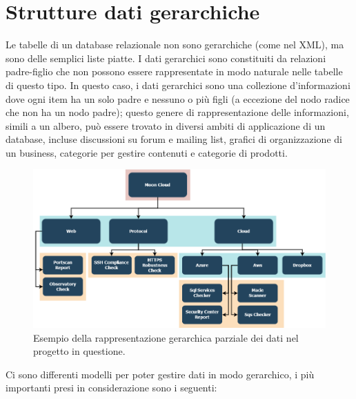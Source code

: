 \section{Strutture dati gerarchiche}
Le tabelle di un database relazionale non sono gerarchiche (come nel XML), ma sono delle semplici liste piatte. I dati gerarchici sono 
constituiti da relazioni padre-figlio che non possono essere rappresentate in modo naturale nelle tabelle di questo tipo.
In questo caso, i dati gerarchici sono una collezione d'informazioni dove ogni item ha un solo padre e nessuno o più figli 
(a eccezione del nodo radice che non ha un nodo padre); questo genere di rappresentazione delle informazioni, simili a un albero, 
può essere trovato in diversi ambiti di applicazione di un database, incluse discussioni su forum e mailing list, grafici di 
organizzazione di un business, categorie per gestire contenuti e categorie di prodotti.
%
\begin{figure}[ht!]
    \centering
    \includegraphics[scale=0.46]{images/MC_Rec_Tree.png}
    \caption{Esempio della rappresentazione gerarchica parziale dei dati nel progetto in questione.}
    \label{fig:MC_Rec_Tree}
\end{figure}
\hfill \break
Ci sono differenti modelli per poter gestire dati in modo gerarchico, i più importanti presi in considerazione sono i seguenti:
%
